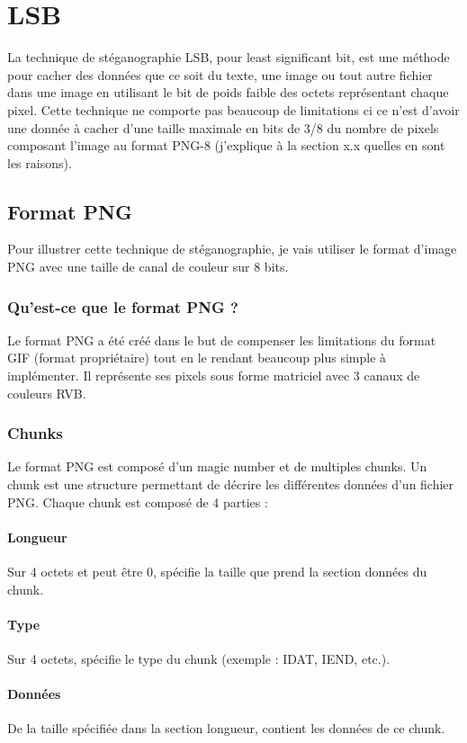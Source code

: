 \newpage
\section{LSB}
La technique de stéganographie LSB, pour least significant bit, est une méthode pour cacher des données que ce soit du texte, une image ou tout autre fichier dans une image en utilisant le bit de poids faible des octets représentant chaque pixel.
\newline
Cette technique ne comporte pas beaucoup de limitations ci ce n'est d'avoir une donnée à cacher d'une taille maximale en bits de 3/8 du nombre de pixels composant l'image au format PNG-8 (j'explique à la section x.x quelles en sont les raisons).
~\cite{pngRationale}

\subsection{Format PNG}
Pour illustrer cette technique de stéganographie, je vais utiliser le format d'image PNG avec une taille de canal de couleur sur 8 bits.

\subsubsection{Qu'est-ce que le format PNG ?}
Le format PNG a été créé dans le but de compenser les limitations du format GIF (format propriétaire) tout en le rendant beaucoup plus simple à implémenter. Il représente ses pixels sous forme matriciel avec 3 canaux de couleurs RVB.

\subsubsection{Chunks}
Le format PNG est composé d'un magic number et de multiples chunks. Un chunk est une structure permettant de décrire les différentes données d'un fichier PNG. Chaque chunk est composé de 4 parties :
\paragraph{Longueur}
Sur 4 octets et peut être 0, spécifie la taille que prend la section données du chunk.
\paragraph{Type}
Sur 4 octets, spécifie le type du chunk (exemple : IDAT, IEND, etc.).
\paragraph{Données}
De la taille spécifiée dans la section longueur, contient les données de ce chunk.
